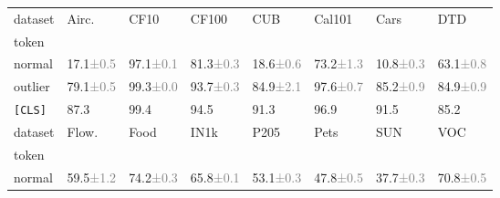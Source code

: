 \documentclass{article} \usepackage{iclr2024_conference,times}
\begin{document}
\begin{table}[h]
    \centering
    
    \begin{tabular}{llllllll}
    \toprule
    dataset &                              Airc. &                               CF10 &                              CF100 &                                CUB &                             Cal101 &                               Cars &                                DTD \\
    token   &                                    &                                    &                                    &                                    &                                    &                                    &                                    \\
    \midrule
    normal  &  17.1\textcolor{gray}{\tiny{±0.5}} &  97.1\textcolor{gray}{\tiny{±0.1}} &  81.3\textcolor{gray}{\tiny{±0.3}} &  18.6\textcolor{gray}{\tiny{±0.6}} &  73.2\textcolor{gray}{\tiny{±1.3}} &  10.8\textcolor{gray}{\tiny{±0.3}} &  63.1\textcolor{gray}{\tiny{±0.8}} \\
    outlier &  79.1\textcolor{gray}{\tiny{±0.5}} &  99.3\textcolor{gray}{\tiny{±0.0}} &  93.7\textcolor{gray}{\tiny{±0.3}} &  84.9\textcolor{gray}{\tiny{±2.1}} &  97.6\textcolor{gray}{\tiny{±0.7}} &  85.2\textcolor{gray}{\tiny{±0.9}} &  84.9\textcolor{gray}{\tiny{±0.9}} \\
    \texttt{[CLS]} &                               87.3 &                               99.4 &                               94.5 &                               91.3 &                               96.9 &                               91.5 &                               85.2 \\
    \bottomrule
    \toprule
    dataset &                              Flow. &                               Food &                               IN1k &                               P205 &                               Pets &                                SUN &                                VOC \\
    token   &                                    &                                    &                                    &                                    &                                    &                                    &                                    \\
    \midrule
    normal  &  59.5\textcolor{gray}{\tiny{±1.2}} &  74.2\textcolor{gray}{\tiny{±0.3}} &  65.8\textcolor{gray}{\tiny{±0.1}} &  53.1\textcolor{gray}{\tiny{±0.3}} &  47.8\textcolor{gray}{\tiny{±0.5}} &  37.7\textcolor{gray}{\tiny{±0.3}} &  70.8\textcolor{gray}{\tiny{±0.5}} \\

\end{tabular}
\end{table}
\end{document}

